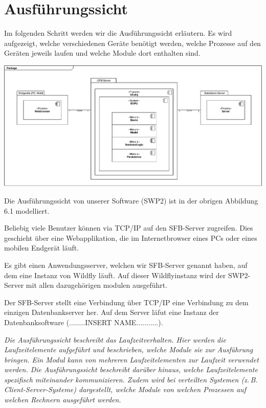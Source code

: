 \documentclass[enabledeprecatedfontcommands,fontsize=12pt,paper=a4,twoside]{scrartcl}
\begin{document}
\section{Ausführungssicht}

\label{sec:ausfuehrung}


{ Im folgenden Schritt werden wir die Ausführungssicht erläutern. Es wird aufgezeigt, welche verschiedenen Geräte benötigt werden, welche Prozesse auf den Geräten jeweils laufen und welche Module dort enthalten sind.
}


\includegraphics[scale=0.5]{UML/06Ausfuehrungssicht.pdf}


{ Die Ausführungssicht von unserer Software (SWP2) ist in der obrigen Abbildung 6.1 modelliert.

Beliebig viele Benutzer können via TCP/IP auf den SFB-Server zugreifen. Dies geschieht über eine Webapplikation, die im Internetbrowser eines PCs oder eines mobilen Endgerät läuft.

Es gibt einen Anwendungsserver, welchen wir SFB-Server genannt haben, auf dem eine Instanz von Wildfly läuft. Auf dieser Wildflyinstanz wird der SWP2-Server mit allen dazugehörigen modulen ausgeführt.

Der SFB-Server stellt eine Verbindung über TCP/IP eine Verbindung zu dem einzigen Datenbankserver her. Auf dem Server läfut eine Instanz der Datenbanksoftware (........INSERT NAME...........).

}

{\it
Die Ausführungssicht beschreibt das Laufzeitverhalten. Hier
werden die Laufzeitelemente aufgeführt und beschrieben, welche Module
sie zur Ausführung bringen. Ein Modul kann von mehreren
Laufzeitelementen zur Laufzeit verwendet werden. Die Ausführungssicht
beschreibt darüber hinaus, welche Laufzeitelemente spezifisch
miteinander kommunizieren. Zudem wird bei verteilten Systemen
(z.\,B. Client-Server-Systeme) dargestellt, welche Module von welchen
Prozessen auf welchen Rechnern ausgeführt werden.}
\end{document}
